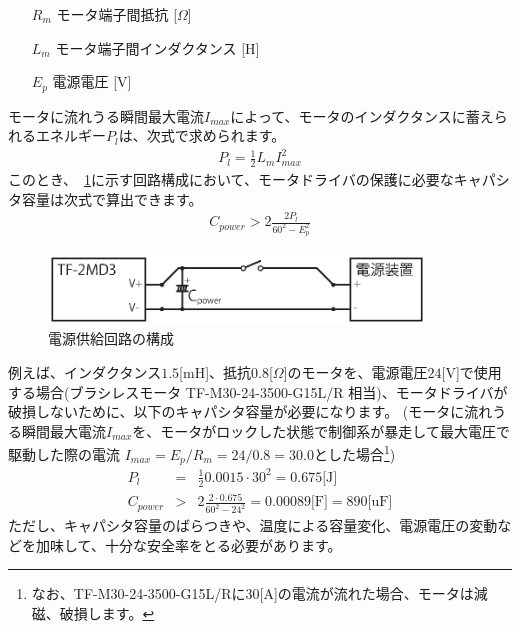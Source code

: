 \documentclass[11pt,a4j,openany,fleqn]{jbook}
\begin{document}
\begin{itemize}
\setlength{\leftskip}{15pt}
\item [$R_{m}$] モータ端子間抵抗 [$\Omega$]
\item [$L_{m}$] モータ端子間インダクタンス [H]
\item [$E_{p}$] 電源電圧 [V]
\end{itemize}

モータに流れうる瞬間最大電流$I_{max}$によって、モータのインダクタンスに蓄えられるエネルギー$P_{l}$は、次式で求められます。
\begin{eqnarray*}
P_{l} = \frac{1}{2} L_{m} I_{max}^{2}
\end{eqnarray*}
このとき、\figurename~\ref{fig:circuit_cap}に示す回路構成において、モータドライバの保護に必要なキャパシタ容量は次式で算出できます。
\begin{eqnarray*}
C_{power} > 2 \frac{2 P_{l}}{60^2 - E_{p}^{2}}
\end{eqnarray*}

\begin{figure}[H]
\centering\includegraphics[width=100mm]{circuit_cap.eps}
\caption{電源供給回路の構成}
\label{fig:circuit_cap}
\end{figure}

例えば、インダクタンス$1.5$[mH]、抵抗$0.8$[$\Omega$]のモータを、電源電圧$24$[V]で使用する場合(ブラシレスモータ TF-M30-24-3500-G15L/R 相当)、モータドライバが破損しないために、以下のキャパシタ容量が必要になります。
(モータに流れうる瞬間最大電流$I_{max}$を、モータがロックした状態で制御系が暴走して最大電圧で駆動した際の電流 $I_{max}=E_{p}/R_{m}=24/0.8=30.0$とした場合\footnote{なお、TF-M30-24-3500-G15L/Rに$30$[A]の電流が流れた場合、モータは減磁、破損します。})
\begin{eqnarray*}
P_{l} &=& \frac{1}{2} 0.0015 \cdot 30^{2} = 0.675 \text{[J]}\\
C_{power} &>& 2 \frac{2 \cdot 0.675}{60^{2} - 24^{2}} = 0.00089 \text{[F]} = 890 \text{[uF]}
\end{eqnarray*}
ただし、キャパシタ容量のばらつきや、温度による容量変化、電源電圧の変動などを加味して、十分な安全率をとる必要があります。
\end{document}

